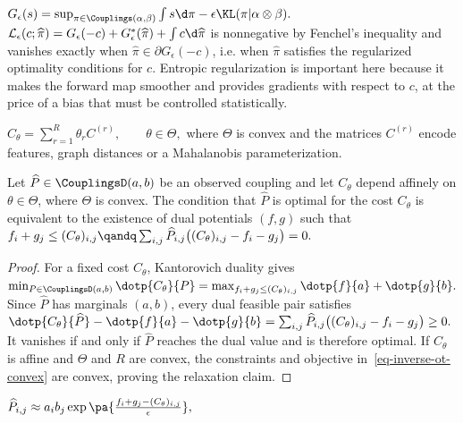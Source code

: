 \(G_\epsilon(s)= \sup_{\pi\in\Couplings(\alpha,\beta)} \int s\d\pi-\epsilon\KL(\pi|\alpha\otimes\beta).\)
\(\mathcal L_\epsilon(c;\widehat\pi) = G_\epsilon(-c)+G_\epsilon^*(\widehat\pi)+\int c\d\widehat\pi\)
is nonnegative by Fenchel's inequality and vanishes exactly when $\widehat\pi\in\partial G_\epsilon(-c)$, i.e. when $\widehat\pi$ satisfies the regularized optimality conditions for $c$. Entropic regularization is important here because it makes the forward map smoother and provides gradients with respect to $c$, at the price of a bias that must be controlled statistically.

\(C_\theta=\sum_{r=1}^R \theta_r C^{(r)}, \qquad \theta\in\Theta,\)
where $\Theta$ is convex and the matrices $C^{(r)}$ encode features, graph distances or a Mahalanobis parameterization.

\begin{prop}\label{prop-inverse-ot-convex}
Let $\widehat P\in\CouplingsD(a,b)$ be an observed coupling and let $C_\theta$ depend affinely on $\theta\in\Theta$, where $\Theta$ is convex. The condition that $\widehat P$ is optimal for the cost $C_\theta$ is equivalent to the existence of dual potentials $(f,g)$ such that
\(f_i+g_j\leq (C_\theta)_{i,j} \qandq \sum_{i,j}\widehat P_{i,j}\big((C_\theta)_{i,j}-f_i-g_j\big)=0.\)
\end{prop}
\begin{proof}
For a fixed cost $C_\theta$, Kantorovich duality gives \(\min_{P\in\CouplingsD(a,b)}\dotp{C_\theta}{P} = \max_{f_i+g_j\leq (C_\theta)_{i,j}} \dotp{f}{a}+\dotp{g}{b}.\)
Since $\widehat P$ has marginals $(a,b)$, every dual feasible pair satisfies \(\dotp{C_\theta}{\widehat P}-\dotp{f}{a}-\dotp{g}{b} = \sum_{i,j}\widehat P_{i,j}\big((C_\theta)_{i,j}-f_i-g_j\big) \geq0.\)
It vanishes if and only if $\widehat P$ reaches the dual value and is therefore optimal. If $C_\theta$ is affine and $\Theta$ and $R$ are convex, the constraints and objective in~\eqref{eq-inverse-ot-convex} are convex, proving the relaxation claim.
\end{proof}
\(\widehat P_{i,j}\approx a_i b_j \exp\pa{\frac{f_i+g_j-(C_\theta)_{i,j}}{\epsilon}},\)